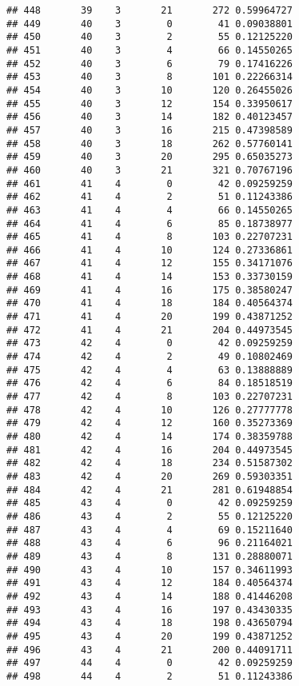 \documentclass[
]{article}
\begin{document}
\begin{verbatim}
## 448       39    3       21       272 0.59964727
## 449       40    3        0        41 0.09038801
## 450       40    3        2        55 0.12125220
## 451       40    3        4        66 0.14550265
## 452       40    3        6        79 0.17416226
## 453       40    3        8       101 0.22266314
## 454       40    3       10       120 0.26455026
## 455       40    3       12       154 0.33950617
## 456       40    3       14       182 0.40123457
## 457       40    3       16       215 0.47398589
## 458       40    3       18       262 0.57760141
## 459       40    3       20       295 0.65035273
## 460       40    3       21       321 0.70767196
## 461       41    4        0        42 0.09259259
## 462       41    4        2        51 0.11243386
## 463       41    4        4        66 0.14550265
## 464       41    4        6        85 0.18738977
## 465       41    4        8       103 0.22707231
## 466       41    4       10       124 0.27336861
## 467       41    4       12       155 0.34171076
## 468       41    4       14       153 0.33730159
## 469       41    4       16       175 0.38580247
## 470       41    4       18       184 0.40564374
## 471       41    4       20       199 0.43871252
## 472       41    4       21       204 0.44973545
## 473       42    4        0        42 0.09259259
## 474       42    4        2        49 0.10802469
## 475       42    4        4        63 0.13888889
## 476       42    4        6        84 0.18518519
## 477       42    4        8       103 0.22707231
## 478       42    4       10       126 0.27777778
## 479       42    4       12       160 0.35273369
## 480       42    4       14       174 0.38359788
## 481       42    4       16       204 0.44973545
## 482       42    4       18       234 0.51587302
## 483       42    4       20       269 0.59303351
## 484       42    4       21       281 0.61948854
## 485       43    4        0        42 0.09259259
## 486       43    4        2        55 0.12125220
## 487       43    4        4        69 0.15211640
## 488       43    4        6        96 0.21164021
## 489       43    4        8       131 0.28880071
## 490       43    4       10       157 0.34611993
## 491       43    4       12       184 0.40564374
## 492       43    4       14       188 0.41446208
## 493       43    4       16       197 0.43430335
## 494       43    4       18       198 0.43650794
## 495       43    4       20       199 0.43871252
## 496       43    4       21       200 0.44091711
## 497       44    4        0        42 0.09259259
## 498       44    4        2        51 0.11243386

\end{verbatim}
\end{document}
